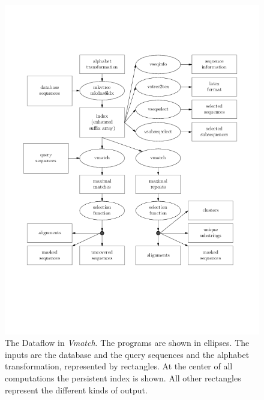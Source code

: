 \documentclass[12pt,titlepage]{article}
\begin{document}
\begin{AboutVmatch}
\begin{figure}
\caption{
The Dataflow in \emph{Vmatch}. The programs
are shown in ellipses. The inputs are the database
and the query sequences and the alphabet transformation,
represented by rectangles. At the center of all
computations the persistent index is shown. All other
rectangles represent the different kinds of output.}
\label{VmatchDataflow}
\ifpdf
\includegraphics[width=\textwidth,height=\textheight]{Dataflow.png}
\else

\centerline{\box\graph}
\fi
\begin{htmlonly}

\end{htmlonly}
\end{figure}
\end{AboutVmatch}
\end{document}
